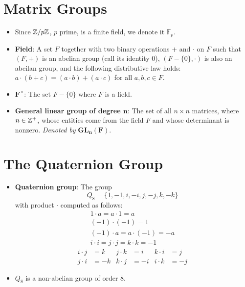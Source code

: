 \documentclass[../notes.tex]{subfiles}
\begin{document}
\section{Matrix Groups}
\begin{itemize}
    \item Since $\mathbb{Z}/p\mathbb{Z}$, $p$ prime, is a finite field, we denote it $\mathbb{F}_p$.
    \item \textbf{Field}: A set $F$ together with two binary operations $+$ and $\cdot$ on $F$ such that $(F,+)$ is an abelian group (call its identity 0), $(F-\{0\},\cdot)$ is also an abeilan group, and the following distributive law holds: $a\cdot(b+c)=(a\cdot b)+(a\cdot c)$ for all $a,b,c\in F$.
    \item $\bm{F^\times}$: The set $F-\{0\}$ where $F$ is a field.
    \item \textbf{General linear group of degree $\bm{n}$}: The set of all $n\times n$ matrices, where $n\in\mathbb{Z}^+$, whose entities come from the field $F$ and whose determinant is nonzero. \emph{Denoted by} $\bm{GL_n(F)}$.
\end{itemize}


\section{The Quaternion Group}
\begin{itemize}
    \item \textbf{Quaternion group}: The group
    \begin{equation*}
        Q_8 = \{1,-1,i,-i,j,-j,k,-k\}
    \end{equation*}
    with product $\cdot$ computed as follows:
    \begin{gather*}
        1\cdot a = a\cdot 1 = a\tag*{for all $a\in Q_8$}\\
        (-1)\cdot(-1) = 1\\
        (-1)\cdot a = a\cdot(-1) = -a\tag*{for all $a\in Q_8$}\\
        i\cdot i = j\cdot j = k\cdot k = -1
    \end{gather*}
    \begin{align*}
        i\cdot j &= k&
            j\cdot k &= i&
                k\cdot i &= j\\
        j\cdot i &= -k&
            k\cdot j &= -i&
                i\cdot k &= -j
    \end{align*}
    \item $Q_8$ is a non-abelian group of order 8.
\end{itemize}
\end{document}
